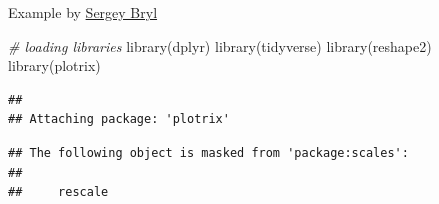 \documentclass[
]{book}
\newenvironment{Shaded}{\begin{snugshade}}{\end{snugshade}}
\newcommand{\AttributeTok}[1]{\textcolor[rgb]{0.77,0.63,0.00}{#1}}
\newcommand{\CommentTok}[1]{\textcolor[rgb]{0.56,0.35,0.01}{\textit{#1}}}
\newcommand{\ConstantTok}[1]{\textcolor[rgb]{0.00,0.00,0.00}{#1}}
\newcommand{\DecValTok}[1]{\textcolor[rgb]{0.00,0.00,0.81}{#1}}
\newcommand{\FloatTok}[1]{\textcolor[rgb]{0.00,0.00,0.81}{#1}}
\newcommand{\FunctionTok}[1]{\textcolor[rgb]{0.00,0.00,0.00}{#1}}
\newcommand{\NormalTok}[1]{#1}
\newcommand{\OtherTok}[1]{\textcolor[rgb]{0.56,0.35,0.01}{#1}}
\newcommand{\SpecialCharTok}[1]{\textcolor[rgb]{0.00,0.00,0.00}{#1}}
\newcommand{\StringTok}[1]{\textcolor[rgb]{0.31,0.60,0.02}{#1}}
\begin{document}
Example by \href{https://www.analyzecore.com/2014/10/17/cart-analysis-r/}{Sergey Bryl}

\begin{Shaded}
\begin{Highlighting}[]
\CommentTok{\# loading libraries}
\FunctionTok{library}\NormalTok{(dplyr)}
\FunctionTok{library}\NormalTok{(tidyverse)}
\FunctionTok{library}\NormalTok{(reshape2)}
\FunctionTok{library}\NormalTok{(plotrix)}
\end{Highlighting}
\end{Shaded}

\begin{verbatim}
## 
## Attaching package: 'plotrix'
\end{verbatim}

\begin{verbatim}
## The following object is masked from 'package:scales':
## 
##     rescale
\end{verbatim}

\begin{Shaded}
\end{Shaded}
\end{document}
